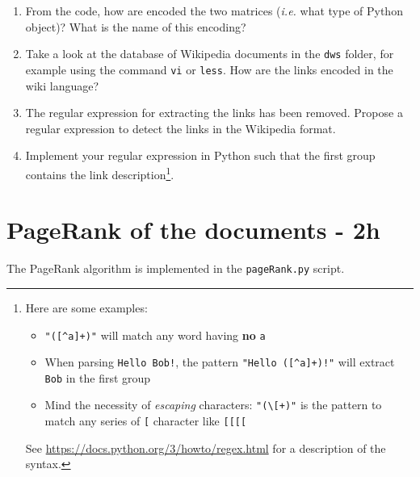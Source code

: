 \documentclass[mathserif, 11pt,c]{article}
\begin{document}
\begin{enumerate}[label=\textbf{Q\thesection.\arabic*}]
	\item From the code, how are encoded the two matrices (\textit{i.e.} what type of Python object)? What is the name of this encoding?
	\item Take a look at the database of Wikipedia documents in the \texttt{dws} folder, for example using the command \texttt{vi} or \texttt{less}. How are the links encoded in the wiki language?
	\item The regular expression for extracting the links has been removed. Propose a regular expression to detect the links in the Wikipedia format.
	\item Implement your regular expression in Python such that the first group contains the link description\footnote{Here are some examples: \begin{itemize}
		\item \texttt{"([\^{}a]+)"} will match any word having \textbf{no} \texttt{a}
		\item When parsing \texttt{Hello Bob!}, the pattern \texttt{"Hello ([\^{}a]+)!"} will extract \texttt{Bob} in the first group 
		\item Mind the necessity of \textit{escaping }characters: \texttt{"(\textbackslash [+)"} is the pattern to match any series of \texttt{[} character like \texttt{[[[[}
	\end{itemize} See \url{https://docs.python.org/3/howto/regex.html} for a description of the syntax.}.
\end{enumerate}


\section{PageRank of the documents - 2h}

The PageRank algorithm is implemented in the \texttt{pageRank.py} script.
\end{document}
